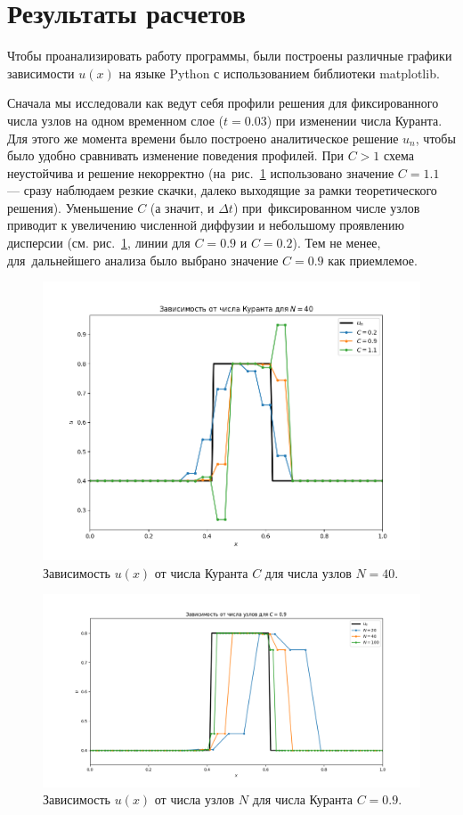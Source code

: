 \documentclass[12pt,a4paper]{article}
\begin{document}
	\section{Результаты расчетов}
	Чтобы проанализировать работу программы, были построены различные графики зависимости $u(x)$ на языке Python с использованием библиотеки matplotlib.
	
	Сначала мы исследовали как ведут себя профили решения для фиксированного числа узлов на одном временном слое ($t = 0.03$) при изменении числа Куранта. Для этого же момента времени было построено аналитическое решение $u_n$, чтобы было удобно сравнивать изменение поведения профилей. При $C > 1$ схема неустойчива и решение некорректно (на~рис.~\ref{fig:change_C} использовано значение $C = 1.1$ --- сразу наблюдаем резкие скачки, далеко выходящие за рамки теоретического решения). Уменьшение $C$ (а значит, и $\Delta t$) при~фиксированном числе узлов приводит к увеличению численной диффузии и небольшому проявлению дисперсии (см. рис.~\ref{fig:change_C}, линии для $C = 0.9$ и $C = 0.2$). Тем не менее, для~дальнейшего анализа было выбрано значение $C = 0.9$ как приемлемое.
	\begin{figure}[h]
		\centering
		\includegraphics[width=18cm]{figures/Figure_1.png}
		\caption{Зависимость $u(x)$ от числа Куранта $C$ для числа узлов $N = 40$.}
		\label{fig:change_C}
	\end{figure}
	\begin{figure}[!h]
		\centering
		\includegraphics[width=18cm]{figures/Figure_2.png}
		\caption{Зависимость $u(x)$ от числа узлов $N$ для числа Куранта $C = 0.9$.}
		\label{fig:change_N}
	\end{figure}
	
\end{document}
